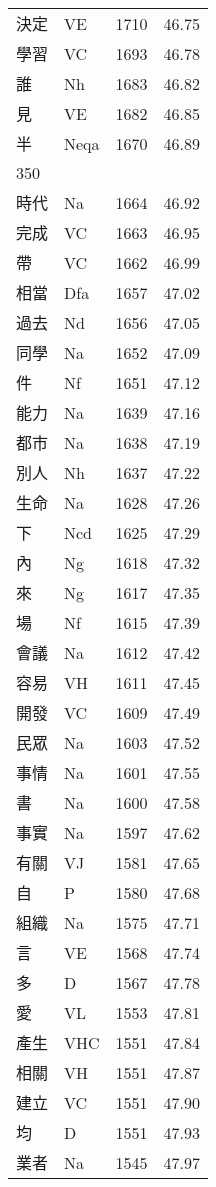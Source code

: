 \documentclass[twocolumn]{book}
\begin{document}
\begin{supertabular}{llrr}
決定 & VE & 1710 &  46.75\\
學習 & VC & 1693 &  46.78\\
誰 & Nh & 1683 &  46.82\\
見 & VE & 1682 &  46.85\\
半 & Neqa & 1670 &  46.89\\
350\\
時代 & Na & 1664 &  46.92\\
完成 & VC & 1663 &  46.95\\
帶 & VC & 1662 &  46.99\\
相當 & Dfa & 1657 &  47.02\\
過去 & Nd & 1656 &  47.05\\
同學 & Na & 1652 &  47.09\\
件 & Nf & 1651 &  47.12\\
能力 & Na & 1639 &  47.16\\
都市 & Na & 1638 &  47.19\\
別人 & Nh & 1637 &  47.22\\
生命 & Na & 1628 &  47.26\\
下 & Ncd & 1625 &  47.29\\
內 & Ng & 1618 &  47.32\\
來 & Ng & 1617 &  47.35\\
場 & Nf & 1615 &  47.39\\
會議 & Na & 1612 &  47.42\\
容易 & VH & 1611 &  47.45\\
開發 & VC & 1609 &  47.49\\
民眾 & Na & 1603 &  47.52\\
事情 & Na & 1601 &  47.55\\
書 & Na & 1600 &  47.58\\
事實 & Na & 1597 &  47.62\\
有關 & VJ & 1581 &  47.65\\
自 & P & 1580 &  47.68\\
組織 & Na & 1575 &  47.71\\
言 & VE & 1568 &  47.74\\
多 & D & 1567 &  47.78\\
愛 & VL & 1553 &  47.81\\
產生 & VHC & 1551 &  47.84\\
相關 & VH & 1551 &  47.87\\
建立 & VC & 1551 &  47.90\\
均 & D & 1551 &  47.93\\
業者 & Na & 1545 &  47.97\\

\end{supertabular}
\end{document}
